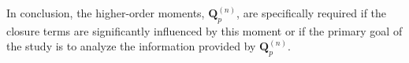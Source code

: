 In conclusion, the higher-order moments, $\textbf{Q}_p^{(n)}$​, are specifically required if the closure terms are significantly influenced by this moment or if the primary goal of the study is to analyze the information provided by $\textbf{Q}_p^{(n)}$.

 
